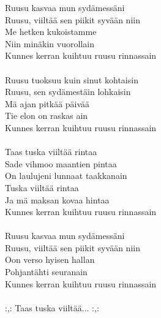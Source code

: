 
Ruusu kasvaa mun sydämessäni\\
Ruusu, viiltää sen piikit syvään niin\\
Me hetken kukoistamme\\
Niin minäkin vuorollain\\
Kunnes kerran kuihtuu ruusu rinnassain\\
\hspace{10mm} \\
Ruusu tuoksuu kuin sinut kohtaisin\\
Ruusu, sen sydämestäin lohkaisin\\
Mä ajan pitkää päivää\\
Tie elon on raskas ain\\
Kunnes kerran kuihtuu ruusu rinnassain\\
\hspace{10mm} \\
Taas tuska viiltää rintaa\\
Sade vihmoo maantien pintaa\\
On laulujeni lunnaat taakkanain\\
Tuska viiltää rintaa\\
Ja mä maksan kovaa hintaa\\
Kunnes kerran kuihtuu ruusu rinnassain\\
\hspace{10mm} \\
Ruusu kasvaa mun sydämessäni\\
Ruusu, viiltää sen piikit syvään niin\\
Oon verso hyisen hallan\\
Pohjantähti seuranain\\
Kunnes kerran kuihtuu ruusu rinnassain\\
\hspace{10mm} \\
:,: Taas tuska viiltää... :,:
